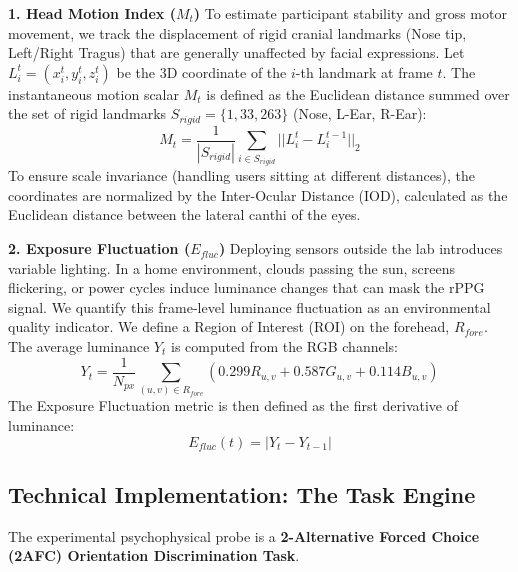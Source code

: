 \documentclass[dvipdfmx]{ehis}
\begin{document}
\textbf{1. Head Motion Index ($M_t$)}
To estimate participant stability and gross motor movement, we track the displacement of rigid cranial landmarks (Nose tip, Left/Right Tragus) that are generally unaffected by facial expressions.
Let $L_i^t = (x_i^t, y_i^t, z_i^t)$ be the 3D coordinate of the $i$-th landmark at frame $t$.
The instantaneous motion scalar $M_t$ is defined as the Euclidean distance summed over the set of rigid landmarks $S_{rigid} = \{1, 33, 263\}$ (Nose, L-Ear, R-Ear):
\begin{equation}
    M_t = \frac{1}{|S_{rigid}|} \sum_{i \in S_{rigid}} || L_i^t - L_i^{t-1} ||_2
\end{equation}
To ensure scale invariance (handling users sitting at different distances), the coordinates are normalized by the Inter-Ocular Distance (IOD),
calculated as the Euclidean distance between the lateral canthi of the eyes.

\textbf{2. Exposure Fluctuation ($E_{fluc}$)}
Deploying sensors outside the lab introduces variable lighting. In a home environment, clouds passing the sun, screens flickering, or power cycles induce luminance changes that can mask the rPPG signal.
We quantify this frame-level luminance fluctuation as an environmental quality indicator.
We define a Region of Interest (ROI) on the forehead, $R_{fore}$. The average luminance $Y_t$ is computed from the RGB channels:
\begin{equation}
    Y_t = \frac{1}{N_{px}} \sum_{(u,v) \in R_{fore}} (0.299R_{u,v} + 0.587G_{u,v} + 0.114B_{u,v})
\end{equation}
The Exposure Fluctuation metric is then defined as the first derivative of luminance:
\begin{equation}
    E_{fluc}(t) = | Y_t - Y_{t-1} |
\end{equation}

\subsection{Technical Implementation: The Task Engine}
The experimental psychophysical probe is a \textbf{2-Alternative Forced Choice (2AFC) Orientation Discrimination Task}.
\end{document}
